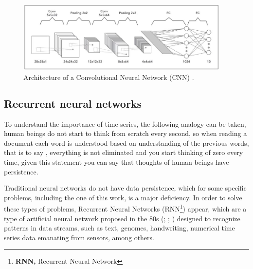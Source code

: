 \begin{figure}[h!]
  \begin{center}	\includegraphics[width=0.95\textwidth]{imagenes/Cap4/cnn}
  \caption{Architecture of a Convolutional Neural Network (CNN) \protect\cite{Reference71}.}
  \label{fig:cnn}
  \end{center}
\end{figure}

\subsection{Recurrent neural networks}

To understand the importance of time series, the following analogy can be taken, human beings do not start to think from scratch every second, so when reading a document each word is understood based on understanding of the previous words, that is to say , everything is not eliminated and you start thinking of zero every time, given this statement you can say that thoughts of human beings have persistence.

\vspace{5mm} %

Traditional neural networks do not have data persistence, which for some specific problems, including the one of this work, is a major deficiency. In order to solve these types of problems, Recurrent Neural Networks (RNN\footnote{\textbf{RNN,} Recurrent Neural Network}) appear, which are a type of artificial neural network proposed in the 80s (; ; ) designed to recognize patterns in data streams, such as text, genomes, handwriting, numerical time series data emanating from sensors, among others.

